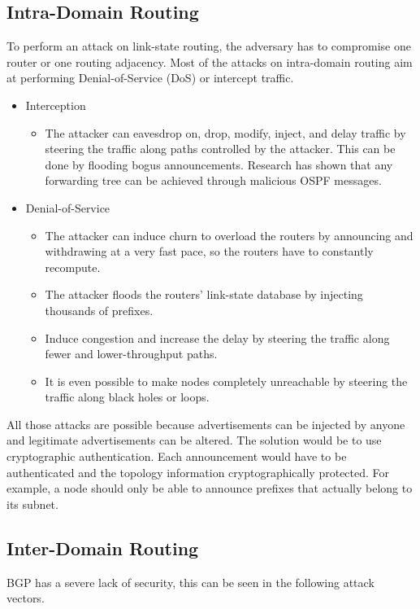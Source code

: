 \subsection{Intra-Domain Routing}
To perform an attack on link-state routing, the adversary has to compromise one router or one routing adjacency. Most of the attacks on intra-domain routing aim at performing Denial-of-Service (DoS) or intercept traffic.
\begin{itemize}
\item Interception
\begin{itemize}
\item The attacker can eavesdrop on, drop, modify, inject, and delay traffic by steering the traffic along paths controlled by the attacker. This can be done by flooding bogus announcements. Research has shown that any forwarding tree can be achieved through malicious OSPF messages.
\end{itemize}
\item Denial-of-Service
\begin{itemize}
\item The attacker can induce churn to overload the routers by announcing and withdrawing at a very fast pace, so the routers have to constantly recompute.
\item The attacker floods the routers' link-state database by injecting thousands of prefixes.
\item Induce congestion and increase the delay by steering the traffic along fewer and lower-throughput paths.
\item It is even possible to make nodes completely unreachable by steering the traffic along black holes or loops.
\end{itemize}
\end{itemize}
All those attacks are possible because advertisements can be injected by anyone and legitimate advertisements can be altered. The solution would be to use cryptographic authentication. Each announcement would have to be authenticated and the topology information cryptographically protected. For example, a node should only be able to announce prefixes that actually belong to its subnet.

\subsection{Inter-Domain Routing}
BGP has a severe lack of security, this can be seen in the following attack vectors.

